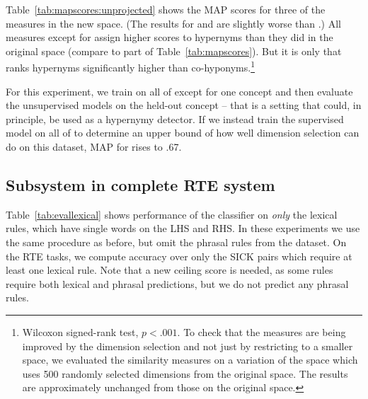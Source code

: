 \documentclass[letterpaper]{article}
\begin{document}
Table~\ref{tab:mapscores:unprojected} shows the MAP scores for three
of the 
measures in the new {\UpWWu} space. (The results for {\balAPinc} and
{\WeedsPrec} are slightly worse than {\ClarkeDE}.)
All measures except for {\cosine}
assign higher scores to hypernyms than they did in the original space
(compare to {\UpWW} part of Table~\ref{tab:mapscores}).
But it is only {\invCL} that ranks hypernyms significantly higher 
than co-hyponyms.\footnote{Wilcoxon signed-rank test, $p < .001$. 
To check that the measures are being improved by the dimension selection and not just by restricting to a smaller space,
we evaluated the similarity measures on a variation
of the {\UpWW} space which uses 500 randomly selected dimensions from the
original space.  The results are approximately unchanged from those on the original
{\UpWW} space.
}

For this experiment, we train on all of {\bless}
except for one concept and then evaluate the unsupervised models on
the held-out concept -- that is a setting that could, in principle, be
used as a hypernymy detector. If we instead train the supervised model
on all of {\bless} to determine an upper bound of how well dimension
selection can do on this dataset, MAP for {\invCL} rises to .67.



\subsection{Subsystem in complete RTE system \cite{beltagy:2016:cl}}
\label{sec:rtesubsystem}

Table~\ref{tab:evallexical} shows performance of the classifier on {\em only}
the lexical rules, which have single words on the LHS and RHS. In these
experiments we use the same procedure as before, but omit the phrasal rules
from the dataset. On the RTE tasks, we compute accuracy over only the SICK
pairs which require at least one lexical rule. Note that a new ceiling
score is needed, as some rules require both lexical and phrasal
predictions, but we do not predict any phrasal rules.
\end{document}
